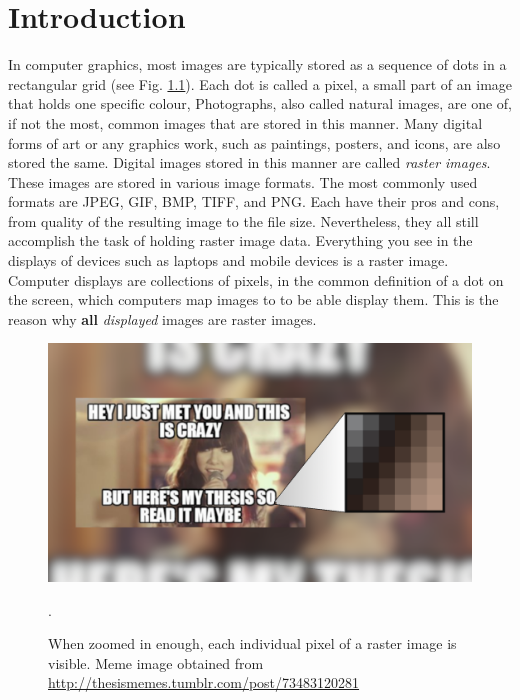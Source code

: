 \chapter{Introduction} \label{sec:intro}

In computer graphics, most images are typically stored as a sequence of dots in a rectangular grid (see Fig. \ref{fig:raster-images-upclose}). Each dot is called a pixel, a small part of an image that holds one specific colour, Photographs, also called natural images\cite{hoshyari2018perceptiondriven}, are one of, if not the most, common images that are stored in this manner. Many digital forms of art or any graphics work, such as paintings, posters, and icons, are also stored the same. Digital images stored in this manner are called \textit{raster images}. These images are stored in various image formats. The most commonly used formats are JPEG, GIF, BMP, TIFF, and PNG. Each have their pros and cons, from quality of the resulting image to the file size. Nevertheless, they all still accomplish the task of holding raster image data. Everything you see in the displays of devices such as laptops and mobile devices is a raster image. Computer displays are collections of pixels, in the common definition of a dot on the screen, which computers map images to to be able display them. This is the reason why \textbf{all} \textit{displayed} images are raster images.

\begin{figure}[h]
	\centering
	\includegraphics[scale=1.0]{images/chap01-introduction/raster-images-upclose.png}
	\caption{When zoomed in enough, each individual pixel of a raster image is visible. Meme image obtained from \protect\url{http://thesismemes.tumblr.com/post/73483120281}}.
	\label{fig:raster-images-upclose}
\end{figure}

